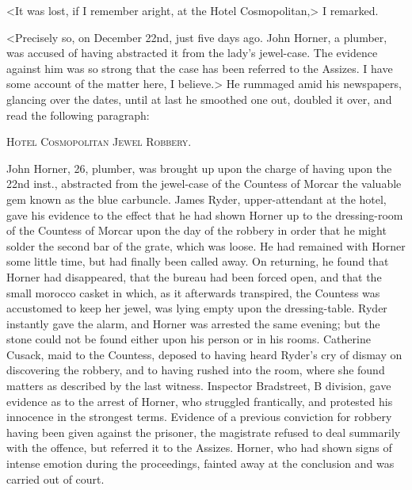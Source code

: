 <It was lost, if I remember aright, at the Hotel Cosmopolitan,> I remarked.

<Precisely so, on December 22nd, just five days ago. John Horner, a plumber, was accused of having abstracted it from the lady's jewel-case. The evidence against him was so strong that the case has been referred to the Assizes. I have some account of the matter here, I believe.> He rummaged amid his newspapers, glancing over the dates, until at last he smoothed one out, doubled it over, and read the following paragraph:

\sffamily

\begin{samepage}
\begin{center}
\textsc{Hotel Cosmopolitan Jewel Robbery. }
\end{center}
\indent John Horner, 26, plumber, was brought up upon the charge of having upon the 22nd inst., abstracted from the jewel-case of the Countess of Morcar the valuable gem known as the blue carbuncle. James Ryder, upper-attendant at the hotel, gave his evidence to the effect that he had shown Horner up to the dressing-room of the Countess of Morcar upon the day of the robbery in order that he might solder the second bar of the grate, which was loose. He had remained with Horner some little time, but had finally been called away. On returning, he found that Horner had disappeared, that the bureau had been forced open, and that the small morocco casket in which, as it afterwards transpired, the Countess was accustomed to keep her jewel, was lying empty upon the dressing-table. Ryder instantly gave the alarm, and Horner was arrested the same evening; but the stone could not be found either upon his person or in his rooms. Catherine Cusack, maid to the Countess, deposed to having heard Ryder's cry of dismay on discovering the robbery, and to having rushed into the room, where she found matters as described by the last witness. Inspector Bradstreet, B division, gave evidence as to the arrest of Horner, who struggled frantically, and protested his innocence in the strongest terms. Evidence of a previous conviction for robbery having been given against the prisoner, the magistrate refused to deal summarily with the offence, but referred it to the Assizes. Horner, who had shown signs of intense emotion during the proceedings, fainted away at the conclusion and was carried out of court.
\end{samepage}
\\~
\rmfamily


